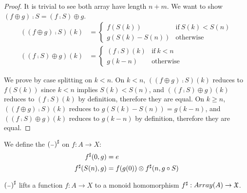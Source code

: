 \begin{proof}
It is trivial to see both array have length $n + m$. We want to show $(f \oplus g) \comp S = (f \comp S) \oplus g$.
\begin{align*}
   ((f \oplus g) \comp S)(k) & = \begin{cases}
       f(S(k)) & \text{if}\ S(k) < S(n) \\
       g(S(k) - S(n)) & \text{otherwise}
   \end{cases} \\
   ((f \comp S) \oplus g)(k) & = \begin{cases}
       (f \comp S)(k) & \text{if}\ k < n \\
       g(k - n) & \text{otherwise}
   \end{cases}
\end{align*}

We prove by case splitting on $k < n$.
On $k < n$, $((f \oplus g) \comp S)(k)$ reduces to $f(S(k))$ since $k < n$ implies $S(k) < S(n)$,
and $((f \comp S) \oplus g)(k)$ reduces to $(f \comp S)(k)$ by definition, therefore they are equal.
On $k \geq n$, $((f \oplus g) \comp S)(k)$ reduces to $g(S(k) - S(n)) = g(k - n)$,
and $((f \comp S) \oplus g)(k)$ reduces to $g(k - n)$ by definition, therefore they are equal.
\end{proof}

\begin{definition}
We define the ${({\scriptstyle{-}})}^{\sharp}$ on $f : A \to X$:
\begin{align*}
    {f}^{\sharp}(0 , g) & = e \\
    {f}^{\sharp}(S(n) , g) & = f(g(0)) \otimes {f}^{\sharp}(n , g \circ S)
\end{align*} 
\end{definition}

\begin{propositionrep}
    ${({\scriptstyle{-}})}^{\sharp}$ lifts a function $f : A \to X$ to a monoid homomorphism ${f}^{\sharp} : Array(A) \to \mathfrak{X}$.
\end{propositionrep}

